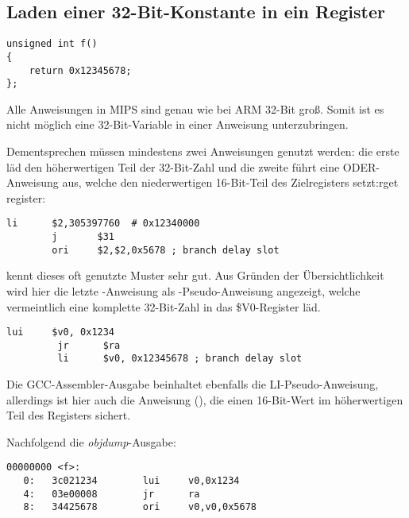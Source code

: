 ﻿\subsection{Laden einer 32-Bit-Konstante in ein Register}
\label{MIPS_big_constants}

\begin{lstlisting}[style=customc]
unsigned int f()
{
	return 0x12345678;
};
\end{lstlisting}

Alle Anweisungen in MIPS sind genau wie bei ARM 32-Bit groß. Somit ist es nicht
möglich eine 32-Bit-Variable in einer Anweisung unterzubringen.

Dementsprechen müssen mindestens zwei Anweisungen genutzt werden:
die erste läd den höherwertigen Teil der 32-Bit-Zahl und die zweite führt eine
ODER-Anweisung aus, welche den niederwertigen 16-Bit-Teil des Zielregisters setzt:rget register:

\begin{lstlisting}[caption=GCC 4.4.5 -O3 (\assemblyOutput),style=customasmMIPS]
        li      $2,305397760  # 0x12340000
        j       $31
        ori     $2,$2,0x5678 ; branch delay slot
\end{lstlisting}

\IDA kennt dieses oft genutzte Muster sehr gut. Aus Gründen der Übersichtlichkeit
wird hier die letzte -Anweisung als -Pseudo-Anweisung angezeigt,
welche vermeintlich eine komplette 32-Bit-Zahl in das \$V0-Register läd.


\begin{lstlisting}[caption=GCC 4.4.5 -O3 (IDA),style=customasmMIPS]
         lui     $v0, 0x1234
         jr      $ra
         li      $v0, 0x12345678 ; branch delay slot
\end{lstlisting}

Die GCC-Assembler-Ausgabe beinhaltet ebenfalls die LI-Pseudo-Anweisung, allerdings
ist hier auch die Anweisung  (), die einen 16-Bit-Wert
im höherwertigen Teil des Registers sichert.

Nachfolgend die \emph{objdump}-Ausgabe:

\begin{lstlisting}[caption=objdump,style=customasmMIPS]
00000000 <f>:
   0:   3c021234        lui     v0,0x1234
   4:   03e00008        jr      ra
   8:   34425678        ori     v0,v0,0x5678
\end{lstlisting}

